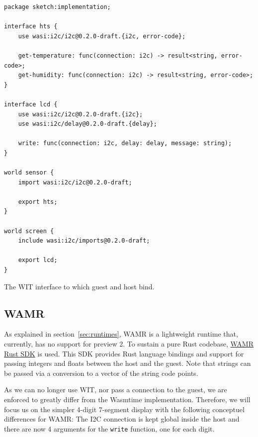 \begin{listing}[h]
\begin{verbatim}
package sketch:implementation;

interface hts {
    use wasi:i2c/i2c@0.2.0-draft.{i2c, error-code};

    get-temperature: func(connection: i2c) -> result<string, error-code>;
    get-humidity: func(connection: i2c) -> result<string, error-code>;
}

interface lcd {
    use wasi:i2c/i2c@0.2.0-draft.{i2c};
    use wasi:i2c/delay@0.2.0-draft.{delay};

    write: func(connection: i2c, delay: delay, message: string);
}

world sensor {
    import wasi:i2c/i2c@0.2.0-draft;

    export hts;
}

world screen {
    include wasi:i2c/imports@0.2.0-draft;

    export lcd;
}
\end{verbatim}
\caption{The \gls{WIT} interface to which guest and host bind.}
\label{code:wit}
\end{listing}

\subsection{WAMR}
As explained in section~\ref{sec:runtimes}, \gls{WAMR} is a lightweight runtime that, currently, has no support for preview 2. To sustain a pure Rust codebase, \href{https://github.com/bytecodealliance/wamr-rust-sdk}{WAMR Rust SDK} is used. This SDK provides Rust language bindings and support for passing integers and floats between the host and the guest. Note that strings can be passed via a conversion to a vector of the string code points.

As we can no longer use \gls{WIT}, nor pass a connection to the guest, we are enforced to greatly differ from the Wasmtime implementation. Therefore, we will focus us on the simpler 4-digit 7-segment display with the following conceptuel differences for \gls{WAMR}: The \gls{I2C} connection is kept global inside the host and there are now 4 arguments for the \texttt{write} function, one for each digit.

